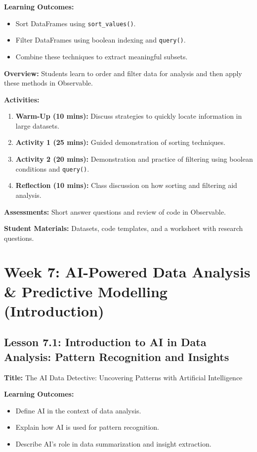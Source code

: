 \documentclass{tufte-book}
\begin{document}
\medskip
\textbf{Learning Outcomes:}
\begin{itemize}[leftmargin=*, label={\textbullet}]
    \item Sort DataFrames using \texttt{sort\_values()}.
    \item Filter DataFrames using boolean indexing and \texttt{query()}.
    \item Combine these techniques to extract meaningful subsets.
\end{itemize}

\medskip
\textbf{Overview:}  
Students learn to order and filter data for analysis and then apply these methods in Observable.

\medskip
\textbf{Activities:}
\begin{enumerate}[label=\arabic*.]
    \item \textbf{Warm-Up (10 mins):} Discuss strategies to quickly locate information in large datasets.
    \item \textbf{Activity 1 (25 mins):} Guided demonstration of sorting techniques.
    \item \textbf{Activity 2 (20 mins):} Demonstration and practice of filtering using boolean conditions and \texttt{query()}.
    \item \textbf{Reflection (10 mins):} Class discussion on how sorting and filtering aid analysis.
\end{enumerate}

\medskip
\textbf{Assessments:}  
Short answer questions and review of code in Observable.

\medskip
\textbf{Student Materials:}  
Datasets, code templates, and a worksheet with research questions.

\section{Week 7: AI-Powered Data Analysis \& Predictive Modelling (Introduction)}

\subsection{Lesson 7.1: Introduction to AI in Data Analysis: Pattern Recognition and Insights}
\textbf{Title:} The AI Data Detective: Uncovering Patterns with Artificial Intelligence

\medskip
\textbf{Learning Outcomes:}
\begin{itemize}[leftmargin=*, label={\textbullet}]
    \item Define AI in the context of data analysis.
    \item Explain how AI is used for pattern recognition.
    \item Describe AI’s role in data summarization and insight extraction.
\end{itemize}
\end{document}
